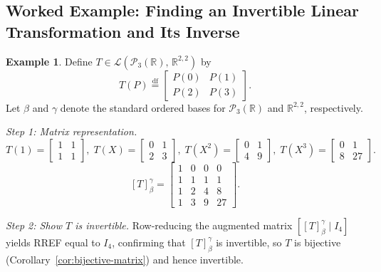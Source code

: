 \documentclass[11pt, a4paper, notitlepage]{report}
\theoremstyle{definition}
\newtheorem{example}[theorem]{Example}
\theoremstyle{remark}
\begin{document}
\subsection{Worked Example: Finding an Invertible Linear Transformation and Its Inverse}

\begin{example}
\label{ex:invertible-poly-matrix}
Define $T \in \mathcal{L}(\mathscr{P}_3(\mathbb{R}),\, \mathbb{R}^{2,2})$ by
\[
  T(P) \stackrel{\mathrm{df}}{=} \begin{bmatrix} P(0) & P(1) \\ P(2) & P(3) \end{bmatrix}.
\]
Let $\beta$ and $\gamma$ denote the standard ordered bases for $\mathscr{P}_3(\mathbb{R})$ and
$\mathbb{R}^{2,2}$, respectively.

\emph{Step 1: Matrix representation.}
\[
  T(1)=\begin{bmatrix}1&1\\1&1\end{bmatrix},\;
  T(X)=\begin{bmatrix}0&1\\2&3\end{bmatrix},\;
  T(X^2)=\begin{bmatrix}0&1\\4&9\end{bmatrix},\;
  T(X^3)=\begin{bmatrix}0&1\\8&27\end{bmatrix}.
\]
\[
  [T]_\beta^\gamma =
  \begin{bmatrix}1&0&0&0\\1&1&1&1\\1&2&4&8\\1&3&9&27\end{bmatrix}.
\]

\emph{Step 2: Show $T$ is invertible.}  Row-reducing the augmented matrix
$[[T]_\beta^\gamma \mid I_4]$ yields RREF equal to $I_4$, confirming that
$[T]_\beta^\gamma$ is invertible, so $T$ is bijective (Corollary~\ref{cor:bijective-matrix})
and hence invertible.


\end{example}
\end{document}

